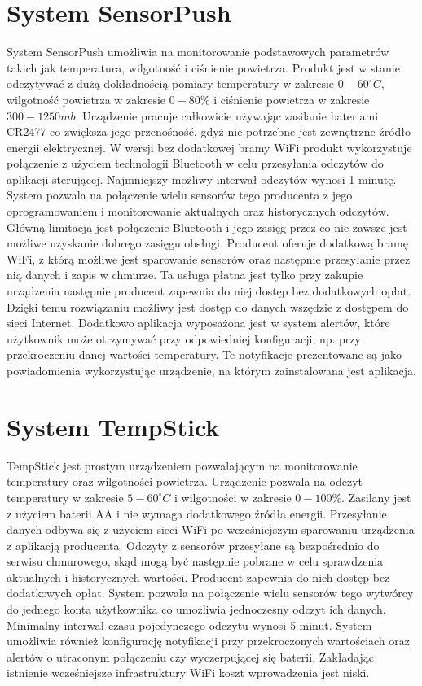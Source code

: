 \section{System SensorPush}
System SensorPush\cite{sensorpush} umożliwia na monitorowanie podstawowych parametrów takich jak temperatura,
wilgotność i ciśnienie powietrza. Produkt jest w stanie odczytywać z dużą dokładnością pomiary temperatury
w zakresie $0 - 60 ^\circ C$, wilgotność powietrza w zakresie $0-80\%$ i ciśnienie powietrza w zakresie 
$300 - 1250mb$. Urządzenie pracuje całkowicie używając zasilanie bateriami CR2477 co zwiększa
jego przenośność, gdyż nie potrzebne jest zewnętrzne źródło energii elektrycznej. 
W wersji bez dodatkowej bramy WiFi produkt wykorzystuje połączenie z użyciem technologii
Bluetooth w celu przesyłania odczytów do aplikacji sterującej. 
Najmniejszy możliwy interwał odczytów wynosi 1 minutę.
System pozwala na połączenie wielu sensorów tego producenta z jego
oprogramowaniem i monitorowanie aktualnych oraz historycznych odczytów. Główną limitacją
jest połączenie Bluetooth i jego zasięg przez co nie zawsze jest możliwe uzyskanie dobrego
zasięgu obsługi. Producent oferuje dodatkową bramę WiFi, z którą możliwe jest sparowanie
sensorów oraz następnie przesyłanie przez nią danych i zapis w chmurze. Ta usługa płatna
jest tylko przy zakupie urządzenia następnie producent zapewnia do niej dostęp bez dodatkowych opłat.
Dzięki temu rozwiązaniu możliwy jest dostęp do danych wszędzie z dostępem do sieci Internet.
Dodatkowo aplikacja wyposażona jest w system alertów, które użytkownik może otrzymywać przy odpowiedniej
konfiguracji, np. przy przekroczeniu danej wartości temperatury. Te notyfikacje prezentowane są
jako powiadomienia wykorzystując urządzenie, na którym zainstalowana jest aplikacja.

\section{System TempStick}
TempStick\cite{tempstick} jest prostym urządzeniem pozwalającym na monitorowanie temperatury oraz wilgotności powietrza.
Urządzenie pozwala na odczyt temperatury w zakresie $5 - 60 ^\circ C$ i wilgotności w zakresie $0-100\%$.
Zasilany jest z użyciem baterii AA i nie wymaga dodatkowego źródła energii.
Przesyłanie danych odbywa się z użyciem sieci WiFi po wcześniejszym sparowaniu urządzenia z aplikacją
producenta. Odczyty z sensorów przesyłane są bezpośrednio do serwisu chmurowego, skąd mogą być następnie
pobrane w celu sprawdzenia aktualnych i historycznych wartości. Producent zapewnia do nich dostęp bez
dodatkowych opłat. System pozwala na połączenie wielu sensorów tego wytwórcy do jednego konta
użytkownika co umożliwia jednoczesny odczyt ich danych. Minimalny interwał czasu pojedynczego
odczytu wynosi 5 minut. System umożliwia również konfigurację notyfikacji przy przekroczonych 
wartościach oraz alertów o utraconym połączeniu czy wyczerpującej się baterii. Zakładając istnienie 
wcześniejsze infrastruktury WiFi koszt wprowadzenia jest niski.

